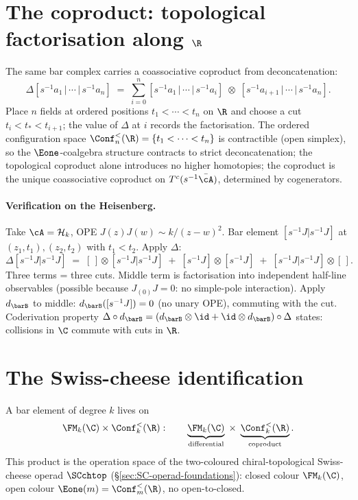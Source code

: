\section*{The coproduct: topological factorisation along $\R$}

The same bar complex carries a coassociative coproduct from
deconcatenation:
\begin{equation}\label{eq:intro-delta}
\Delta[s^{-1}a_1 \,|\, \cdots \,|\, s^{-1}a_n]
\;=\;
\sum_{i=0}^{n}
[s^{-1}a_1 \,|\, \cdots \,|\, s^{-1}a_i]
\;\otimes\;
[s^{-1}a_{i+1} \,|\, \cdots \,|\, s^{-1}a_n].
\end{equation}
Place $n$ fields at ordered positions $t_1 < \cdots < t_n$ on
$\R$ and choose a cut $t_i < t_* < t_{i+1}$; the value of
$\Delta$ at $i$ records the factorisation. The ordered
configuration space $\Conf_n^<(\R) = \{t_1 < \cdots < t_n\}$ is
contractible (open simplex), so the $\Eone$-coalgebra structure
contracts to strict deconcatenation; the topological coproduct alone
introduces no higher homotopies; the
coproduct is the unique coassociative coproduct on
$T^c(s^{-1}\bar\cA)$, determined by cogenerators.

\paragraph{Verification on the Heisenberg.}
Take $\cA = \cH_k$, OPE $J(z)J(w) \sim k/(z-w)^2$. Bar element
$[s^{-1}J | s^{-1}J]$ at $(z_1, t_1), (z_2, t_2)$ with
$t_1 < t_2$. Apply $\Delta$:
\[
\Delta[s^{-1}J | s^{-1}J]
\;=\;
[\,] \otimes [s^{-1}J | s^{-1}J]
\;+\;
[s^{-1}J] \otimes [s^{-1}J]
\;+\;
[s^{-1}J | s^{-1}J] \otimes [\,].
\]
Three terms = three cuts. Middle term is factorisation into
independent half-line observables (possible because $J_{(0)}J = 0$:
no simple-pole interaction). Apply $d_{\barB}$ to middle:
$d_{\barB}([s^{-1}J]) = 0$ (no unary OPE), commuting with the
cut. Coderivation property
$\Delta \circ d_{\barB} = (d_{\barB} \otimes \id +
\id \otimes d_{\barB}) \circ \Delta$ states: collisions in
$\C$ commute with cuts in $\R$.

\section*{The Swiss-cheese identification}

A bar element of degree $k$ lives on
\[
 \FM_k(\C) \times \Conf_k^<(\R):
 \qquad
 \underbrace{\FM_k(\C)}_{\text{differential}}
 \;\times\;
 \underbrace{\Conf_k^<(\R)}_{\text{coproduct}}.
\]
This product is the operation space of the two-coloured
chiral-topological Swiss-cheese operad $\SCchtop$
(\S\ref{sec:SC-operad-foundations}): closed colour $\FM_k(\C)$,
open colour $\Eone(m) = \Conf_m^<(\R)$, no open-to-closed.

